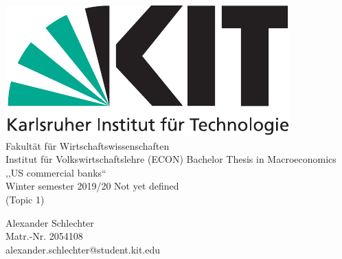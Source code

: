 \documentclass[12pt, a4paper]{article} %
\begin{document}

\begin{titlepage}
\begin{center}
\includegraphics[scale=0.65]{KITlogo}\\
\large
Fakultät für Wirtschaftswissenschaften\\
Institut für Volkswirtschaftslehre (ECON)
\vfill{
\Large
Bachelor Thesis in Macroeconomics\\\vspace{0.5cm}
,,US commercial banks``\\\vspace{0.5cm}
Winter semester 2019/20%
}
\vfill{
\LARGE
Not yet defined
\\ 
\vspace{0.5cm}
\normalsize
(Topic 1)
}
\end{center}

\vfill{
\normalsize
\noindent Alexander Schlechter \\
Matr.-Nr. 2054108 \\
alexander.schlechter@student.kit.edu}
\end{titlepage}
\newpage

\end{document}
